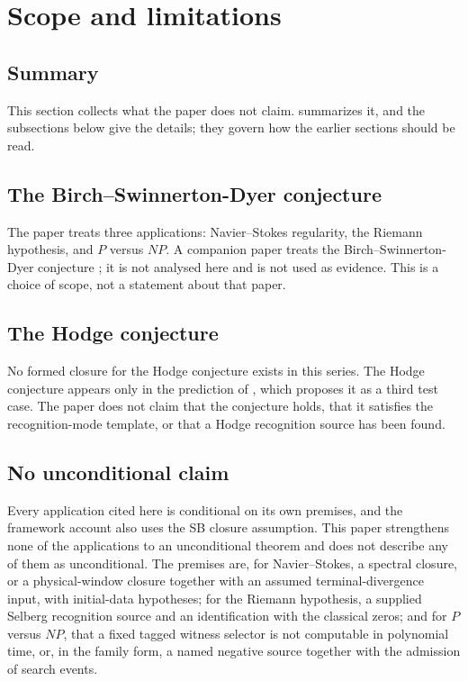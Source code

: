 \section{Scope and limitations}\label{sec:scope}

\subsection{Summary}\label{sec:scope:nonclaims}

This section collects what the paper does not claim.
 summarizes it, and the subsections below give the
details; they govern how the earlier sections should be read.



\subsection{The Birch--Swinnerton-Dyer conjecture}\label{sec:scope:bsd-out}

The paper treats three applications: Navier--Stokes regularity, the
Riemann hypothesis, and \(P\) versus \(NP\).  A companion paper treats
the Birch--Swinnerton-Dyer conjecture \cite{TsiokosBSD2026,Wiles2000BSD};
it is not analysed here and is not used as evidence.  This is a choice
of scope, not a statement about that paper.

\subsection{The Hodge conjecture}\label{sec:scope:hodge-prediction-only}

No formed closure for the Hodge conjecture exists in this series.  The
Hodge conjecture appears only in the prediction of
, which proposes it as a third test case.
The paper does not claim that the conjecture holds, that it satisfies
the recognition-mode template, or that a Hodge recognition source has
been found.

\subsection{No unconditional claim}\label{sec:scope:standard-zfc}

Every application cited here is conditional on its own premises, and
the framework account also uses the SB closure assumption.  This paper
strengthens none of the applications to an unconditional theorem and
does not describe any of them as unconditional.  The premises are, for
Navier--Stokes, a spectral closure, or a physical-window closure
together with an assumed terminal-divergence input, with initial-data
hypotheses; for the Riemann hypothesis, a supplied
Selberg recognition source and an identification with the classical
zeros; and for \(P\) versus \(NP\), that a fixed tagged witness
selector is not computable in polynomial time, or, in the family form,
a named negative source together with the admission of search events.

